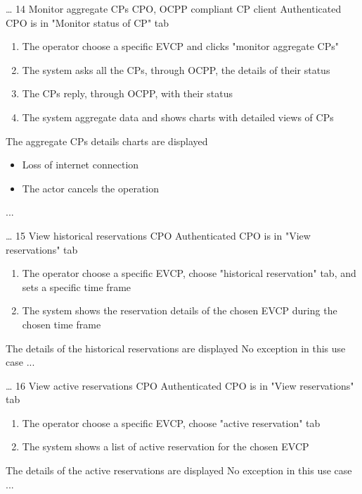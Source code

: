 \usecase
{
    \dots %
}
{14}
{Monitor aggregate CPs} %
{CPO, OCPP compliant CP client} %
{Authenticated CPO is in "Monitor status of CP" tab} %
{ %
    \begin{enumerate}
        \item The operator choose a specific EVCP and clicks "monitor aggregate CPs"
        \item The system asks all the CPs, through OCPP, the details of their status
        \item The CPs reply, through OCPP, with their status
        \item The system aggregate data and shows charts with detailed views of CPs
    \end{enumerate}
}
{The aggregate CPs details charts are displayed} %
{ %
    \begin{itemize}
        \item Loss of internet connection
        \item The actor cancels the operation
    \end{itemize}
}
{ %
    ...
}

\usecase
{
    \dots %
}
{15}
{View historical reservations} %
{CPO} %
{Authenticated CPO is in "View reservations" tab} %
{ %
    \begin{enumerate}
        \item The operator choose a specific EVCP, choose "historical reservation" tab, and sets a specific time frame
        \item The system shows the reservation details of the chosen EVCP during the chosen time frame
    \end{enumerate}
}
{The details of the historical reservations are displayed} %
{ %
    No exception in this use case
}
{ %
    ...
}

\usecase
{
    \dots %
}
{16}
{View active reservations} %
{CPO} %
{Authenticated CPO is in "View reservations" tab} %
{ %
    \begin{enumerate}
        \item The operator choose a specific EVCP, choose "active reservation" tab
        \item The system shows a list of active reservation for the chosen EVCP
    \end{enumerate}
}
{The details of the active reservations are displayed} %
{ %
    No exception in this use case
}
{ %
    ...
}

